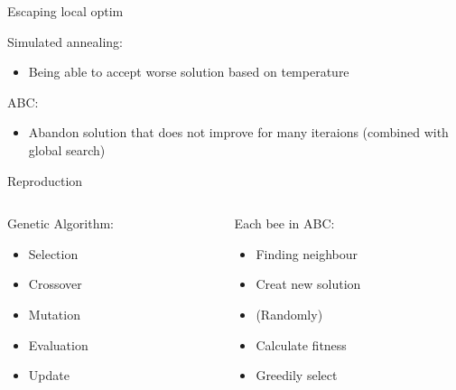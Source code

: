 \documentclass[14pt,ignorenonframetext,compress]{beamer}
\providecommand{\tightlist}{%
  \setlength{\itemsep}{0pt}\setlength{\parskip}{0pt}}
\begin{document}
\begin{frame}{Escaping local optim}
\protect\hypertarget{escaping-local-optim}{}

Simulated annealing:

\begin{itemize}
\tightlist
\item
  Being able to accept worse solution based on temperature
\end{itemize}

\pause

ABC:

\begin{itemize}
\tightlist
\item
  Abandon solution that does not improve for many iteraions (combined
  with global search)
\end{itemize}

\end{frame}

\begin{frame}{Reproduction}
\protect\hypertarget{reproduction}{}

\begin{columns}
\begin{column}{0.48\textwidth}

Genetic Algorithm:
\begin{itemize}
\item Selection
\item Crossover
\item Mutation
\item Evaluation
\item Update
\end{itemize}
\end{column}
\begin{column}{0.48\textwidth}

\pause

Each bee in ABC:
\begin{itemize}
\item Finding neighbour
\item Creat new solution
\item (Randomly)
\item Calculate fitness
\item Greedily select
\end{itemize}

\end{column}
\end{columns}

\end{frame}
\end{document}
